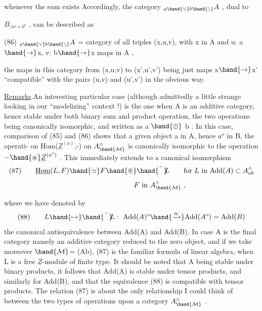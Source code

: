 
whenever the sum exists Accordingly, the category $_{a\hand{\vee}b\hand{\backslash}}A$ , dual to

$B_{/a^{o}\times b^{o}}$ , can be described as 

(86) $_{a\hand{\vee}b\hand{\backslash}}A$ = category of all triples (x,u,v), with x in A and
u: a$\hand{\to}$x, v: b$\hand{\to}$x maps in A ,

the maps in this category from (x,u,v) to (x',u',v') being just maps
x$\hand{\to}$x' ``compatible'' with the pairs \inserted{$\alpha=$}(u,v) and (u',v') in the obvious way.

\uline{Remarks}.An interesting particular case (although admittedly a little
strange looking in our ``modelizing'' context !) is the one when A is 
an additive category, hence stable under both binary sum and product
operation, the two operations being canonically isomorphic, and written
as a $\hand{\oplus}$ b . In this case, comparison of (85) and (86) shows that 
 a given object a in A, hence $a^{o}$ in B, the operati-%
on Hom($\underline{Z}^{(a)}$,-) on $A^{\wedge}_{\hand{\mathcal{M}}}$ is canonically isomorphic to the operation
$-\hand{\circledast}\underline{Z}^{(a^{o})}$ . This immediately extends to a canonical isomorphism
\[
(87)\qquad \underline{\mathrm{Hom}}(L,F)\hand{\simeq} F\hand{\circledast}\hand{\check{\phantom{L}}}\!\!L \qquad \text{for } L \text{ in } \mathrm{Add}(A)\subset A^{\wedge}_{ab}
\]
\[
\qquad\qquad\qquad\qquad F \text{ in } A^{\wedge}_{\hand{\mathcal{M}}} \ ,
\]

where we have denoted by
\[
(88)\qquad L\hand{\mapsto}\hand{\check{\phantom{L}}}\!\!L : \ \mathrm{Add}(A)^{o}\hand{\xrightarrow{\approx}}\mathrm{Add}(A^{o})= \mathrm{Add}(B)
\]
the canonical antiequivalence between Add(A) and Add(B). In case A is
the final category namely an additive category reduced to the zero object,
 and if we take moreover $\hand{\mathcal{M}}$= (Ab), (87) is the familiar formula of
linear algebra, when L is a free $\underline{Z}$-module of finite type. It should be
noted that A being stable under binary products, it follows that Add(A)
is stable under tensor products, and similarly for Add(B), and that
the equivalence (88) is compatible with tensor products. The relation
(87) is about the only relationship I could think of between the two types
of operations upon a category $A^{\wedge}_{\hand{\mathcal{M}}}$ . 

